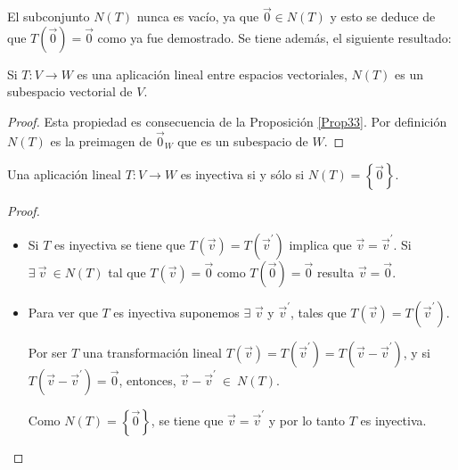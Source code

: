 \bigskip

\bigskip

El subconjunto $N(T)$ nunca es vacío, ya que $\vec{0} \in N(T)$ y esto se deduce de que $T(\vec{0})=\vec{0}$ como ya fue demostrado. Se tiene además, el siguiente resultado:

\bigskip


\bigskip

\begin{theorem}
\label{Prop343}


Si $T: V \rightarrow W$ es una aplicación lineal entre espacios vectoriales, $N(T)$ es un subespacio vectorial de $V$.

\begin{proof}

Esta propiedad  es consecuencia de la Proposición \ref{Prop33}. Por definición $N(T)$ es la preimagen de $\vec{0}_W$ que es un subespacio de $W$.
\end{proof}
\end{theorem} 







\bigskip


\begin{theorem}
\label{Prop345}

Una aplicación lineal  $T: V \rightarrow W$ es inyectiva si y sólo si  $N(T)=\left\{\vec{0} \right\}$.



\begin{proof}
\begin{itemize}
\item
Si $T$ es inyectiva se tiene que $ T(\Vec{v})=T(\Vec{v}^{\prime})$ implica que $\vec{v}=\Vec{v}^{\prime}$. Si $\exists ~ \Vec{v} ~\in N(T)$  tal que  $T(\vec{v})=\vec{0}  $ como $T(\vec{0})=\vec{0}$ resulta $\vec{v}=\vec{0}$.
\item
Para ver que $T$ es inyectiva suponemos $\exists $ $\vec{v}$ y $\vec{v}^{\prime}$, tales que $ T(\vec{v})=T(\vec{v}^{\prime})$.

Por ser $T$ una transformación lineal $T(\vec{v})=T(\vec{v}^{\prime})= T( 
  \vec{v}-\vec{v}^{\prime})$, y si $T( \vec{v}-\vec{v}^{\prime})= \vec{0} $, entonces,  $\vec{v}-\vec{v}^{\prime} ~ \in ~ N(T)$. 
  
  Como $N(T)=\left\{\vec{0} \right\}$, se tiene que $\vec{v}=\Vec{v}^{\prime}$ y por lo tanto $T$ es inyectiva.
 
  
\end{itemize}
\end{proof}
\end{theorem} 

